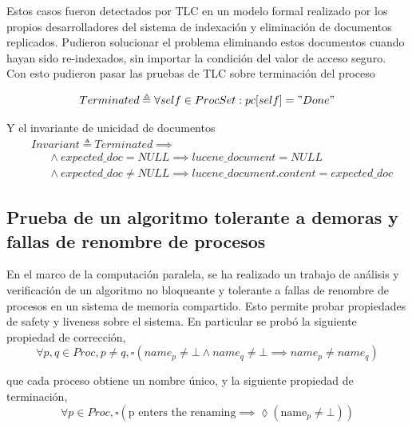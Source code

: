 \documentclass[runningheads]{llncs}
\begin{document}
Estos casos fueron detectados por TLC en un modelo formal realizado por los propios desarrolladores del sistema de indexación y eliminación de documentos replicados. Pudieron solucionar el problema eliminando estos documentos cuando hayan sido re-indexados, sin importar la condición del valor de acceso seguro. Con esto pudieron pasar las pruebas de TLC sobre terminación del proceso

\begin{equation}
    Terminated \triangleq \forall self \in ProcSet: pc[self] = "Done"
\end{equation}

Y el invariante de unicidad de documentos
\[
\begin{aligned}
    &Invariant \triangleq Terminated \implies \\
    &\phantom{Inv} \land expected\_doc = NULL \implies lucene\_document = NULL \\ 
    &\phantom{Inv} \land expected\_doc \neq NULL \implies lucene\_document.content = expected\_doc
\end{aligned}
\]


\subsection{Prueba de un algoritmo tolerante a demoras y fallas de renombre de procesos}
En el marco de la computación paralela, se ha realizado un trabajo \cite{case_study} de análisis y verificación de un algoritmo no bloqueante y tolerante a fallas de renombre de procesos en un sistema de memoria compartido. Esto permite probar propiedades de safety y liveness sobre el sistema. En particular se probó la siguiente propiedad de corrección, 
\begin{equation}
    \forall p, q \in Proc, p \neq q, \square(name_p \neq \bot \land name_q \neq \bot \implies name_p \neq name_q)
\end{equation}

que cada proceso obtiene un nombre único, y la siguiente propiedad de terminación,
\begin{equation}
    \forall p \in Proc, \square(\text{p enters the renaming} \implies \lozenge (\text{name}_p \neq \bot))
\end{equation}
\end{document}
